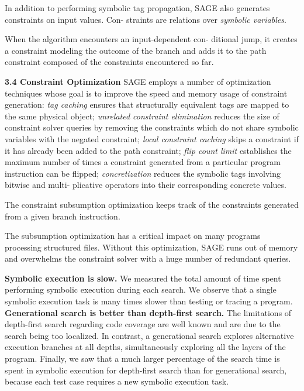 In addition to performing symbolic tag propagation, SAGE also generates constraints on input values. Con- straints are relations over \textit{symbolic variables}.

When the algorithm encounters an input-dependent con- ditional jump, it creates a constraint modeling the outcome of the branch and adds it to the path constraint composed of the constraints encountered so far.

\textbf{3.4 Constraint Optimization}
SAGE employs a number of optimization techniques whose goal is to improve the speed and memory usage of constraint generation: \textit{tag caching} ensures that structurally equivalent tags are mapped to the same physical object; 
\textit{unrelated constraint elimination} reduces the size of constraint solver queries by removing the constraints which do not share symbolic variables with the negated constraint; 
\textit{local constraint caching} skips a constraint if it has already been added to the path constraint; 
\textit{flip count limit} establishes the maximum number of times a constraint generated from a particular program instruction can be flipped; 
\textit{concretization} reduces the symbolic tags involving bitwise and multi- plicative operators into their corresponding concrete values.

The constraint subsumption optimization keeps track of the constraints generated from a given branch instruction.

The subsumption optimization has a critical impact on many programs processing structured files.
Without this optimization, SAGE runs out of memory and overwhelms the constraint solver with a huge number of redundant queries.

\textbf{Symbolic execution is slow.} We measured the total amount of time spent performing symbolic execution during each search. 
We observe that a single symbolic execution task is many times slower than testing or tracing a program.
\textbf{Generational search is better than depth-first search.}
The limitations of depth-first search regarding code coverage are well known and are due to the search being too localized. 
In contrast, a generational search explores alternative execution branches at all depths, simultaneously exploring all the layers of the program. 
Finally, we saw that a much larger percentage of the search time is spent in symbolic execution for depth-first search than for generational search, because each test case requires a new symbolic execution task.

